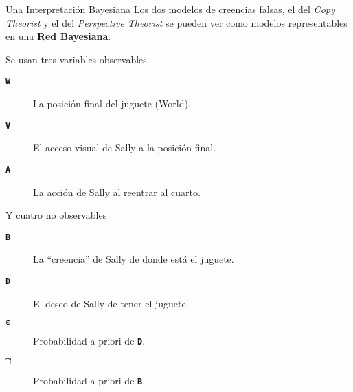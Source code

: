 \documentclass{beamer}
\begin{document}
\begin{frame}[fragile]{Una Interpretación Bayesiana}
Los dos modelos de creencias falsas, el del \textit{Copy Theorist} y el del \textit{Perspective Theorist} se pueden ver como modelos representables en una \textbf{Red Bayesiana}.

\vspace{1em}
Se usan tres variables observables.
\begin{description}
	\item[\texttt{\textbf{W}}] La posición final del juguete (World).
	\item[\texttt{\textbf{V}}] El acceso visual de Sally a la posición final.
	\item[\texttt{\textbf{A}}] La acción de Sally al reentrar al cuarto.
\end{description}

Y cuatro no observables
\begin{description}
	\item[\texttt{\textbf{B}}] La ``creencia'' de Sally de donde está el juguete.
	\item[\texttt{\textbf{D}}] El deseo de Sally de tener el juguete.
	\item[\(\boldsymbol{\varepsilon}\)] Probabilidad a priori de \texttt{\textbf{D}}.
	\item[\(\boldsymbol{\gamma}\)] Probabilidad a priori de \texttt{\textbf{B}}.
\end{description}
\end{frame}
\end{document}
